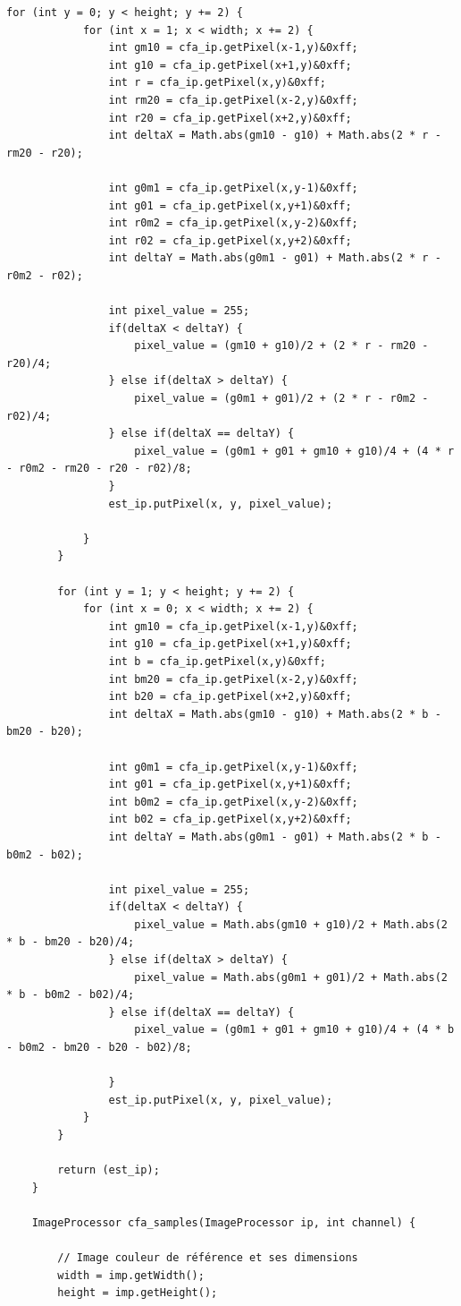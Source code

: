 \documentclass[a4paper,11pt]{article}
\begin{document}
\begin{lstlisting}[caption=Code de la troisième partie du TP]
		for (int y = 0; y < height; y += 2) {
			for (int x = 1; x < width; x += 2) {
				int gm10 = cfa_ip.getPixel(x-1,y)&0xff;
				int g10 = cfa_ip.getPixel(x+1,y)&0xff;
				int r = cfa_ip.getPixel(x,y)&0xff;
				int rm20 = cfa_ip.getPixel(x-2,y)&0xff;
				int r20 = cfa_ip.getPixel(x+2,y)&0xff;
				int deltaX = Math.abs(gm10 - g10) + Math.abs(2 * r - rm20 - r20);
				
				int g0m1 = cfa_ip.getPixel(x,y-1)&0xff;
				int g01 = cfa_ip.getPixel(x,y+1)&0xff;
				int r0m2 = cfa_ip.getPixel(x,y-2)&0xff;
				int r02 = cfa_ip.getPixel(x,y+2)&0xff;
				int deltaY = Math.abs(g0m1 - g01) + Math.abs(2 * r - r0m2 - r02);
				
				int pixel_value = 255;
				if(deltaX < deltaY) {
					pixel_value = (gm10 + g10)/2 + (2 * r - rm20 - r20)/4;
				} else if(deltaX > deltaY) {
					pixel_value = (g0m1 + g01)/2 + (2 * r - r0m2 - r02)/4;
				} else if(deltaX == deltaY) {
					pixel_value = (g0m1 + g01 + gm10 + g10)/4 + (4 * r - r0m2 - rm20 - r20 - r02)/8;
				}
				est_ip.putPixel(x, y, pixel_value);
				
			}
		}
		
		for (int y = 1; y < height; y += 2) {
			for (int x = 0; x < width; x += 2) {
				int gm10 = cfa_ip.getPixel(x-1,y)&0xff;
				int g10 = cfa_ip.getPixel(x+1,y)&0xff;
				int b = cfa_ip.getPixel(x,y)&0xff;
				int bm20 = cfa_ip.getPixel(x-2,y)&0xff;
				int b20 = cfa_ip.getPixel(x+2,y)&0xff;
				int deltaX = Math.abs(gm10 - g10) + Math.abs(2 * b - bm20 - b20);
				
				int g0m1 = cfa_ip.getPixel(x,y-1)&0xff;
				int g01 = cfa_ip.getPixel(x,y+1)&0xff;
				int b0m2 = cfa_ip.getPixel(x,y-2)&0xff;
				int b02 = cfa_ip.getPixel(x,y+2)&0xff;
				int deltaY = Math.abs(g0m1 - g01) + Math.abs(2 * b - b0m2 - b02);
				
				int pixel_value = 255;
				if(deltaX < deltaY) {
					pixel_value = Math.abs(gm10 + g10)/2 + Math.abs(2 * b - bm20 - b20)/4;
				} else if(deltaX > deltaY) {
					pixel_value = Math.abs(g0m1 + g01)/2 + Math.abs(2 * b - b0m2 - b02)/4;
				} else if(deltaX == deltaY) {
					pixel_value = (g0m1 + g01 + gm10 + g10)/4 + (4 * b - b0m2 - bm20 - b20 - b02)/8;
					
				}
				est_ip.putPixel(x, y, pixel_value);
			}
		}
		
	    return (est_ip);
	}
	
	ImageProcessor cfa_samples(ImageProcessor ip, int channel) {

		// Image couleur de référence et ses dimensions
		width = imp.getWidth();
		height = imp.getHeight();


\end{lstlisting}
\end{document}
